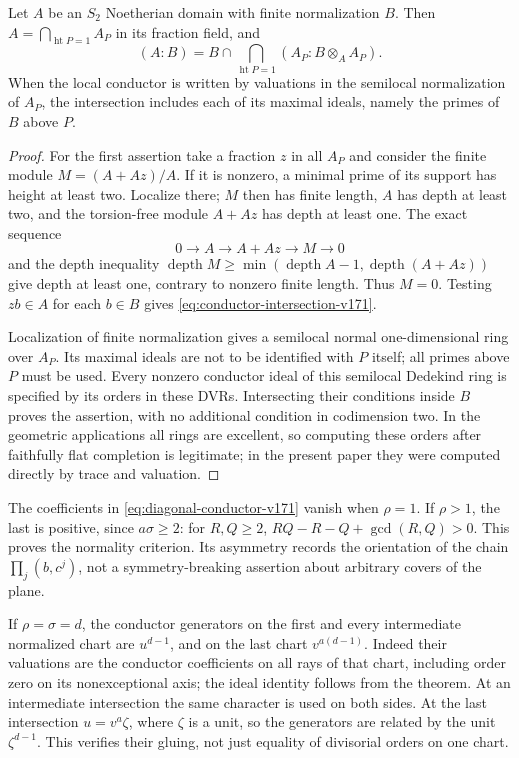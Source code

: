 \begin{lemma}
\label{lem:conductor-depth-v171}
Let $A$ be an $S_2$ Noetherian domain with finite normalization $B$.
Then $A=\bigcap_{\operatorname{ht}P=1}A_P$ in its fraction field, and
\begin{equation}\label{eq:conductor-intersection-v171}
 (A:B)=B\cap\bigcap_{\operatorname{ht}P=1}
             (A_P:B\otimes_A A_P).
\end{equation}
When the local conductor is written by valuations in the semilocal
normalization of $A_P$, the intersection includes each of its maximal
ideals, namely the primes of $B$ above $P$.
\end{lemma}
\begin{proof}
For the first assertion take a fraction $z$ in all $A_P$ and consider
the finite module $M=(A+Az)/A$. If it is nonzero, a minimal prime of
its support has height at least two. Localize there; $M$ then has
finite length, $A$ has depth at least two, and the torsion-free
module $A+Az$ has depth at least one. The exact sequence
\[
 0\longrightarrow A\longrightarrow A+Az\longrightarrow M
 \longrightarrow0
\]
and the depth inequality
$\operatorname{depth}M\geq\min(\operatorname{depth}A-1,
\operatorname{depth}(A+Az))$ give depth at least one, contrary to
nonzero finite length. Thus $M=0$. Testing $zb\in A$ for each $b\in B$
gives \eqref{eq:conductor-intersection-v171}.

Localization of finite normalization gives a semilocal normal
one-dimensional ring over $A_P$. Its maximal ideals are not to be
identified with $P$ itself; all primes above $P$ must be used.
Every nonzero conductor ideal of this semilocal Dedekind ring is
specified by its orders in these DVRs. Intersecting their conditions
inside $B$ proves the assertion, with no additional condition in
codimension two. In the geometric applications all rings are excellent,
so computing these orders after faithfully flat completion is legitimate;
in the present paper they were computed directly by trace and valuation.
\end{proof}

The coefficients in \eqref{eq:diagonal-conductor-v171} vanish when
$\rho=1$. If $\rho>1$, the last is positive, since $a\sigma\geq2$:
for $R,Q\geq2$, $RQ-R-Q+\gcd(R,Q)>0$. This proves the normality
criterion. Its asymmetry records the orientation of the chain
$\prod_j(b,c^j)$, not a symmetry-breaking assertion about arbitrary
covers of the plane.

If $\rho=\sigma=d$, the conductor generators on the first and every
intermediate normalized chart are $u^{d-1}$, and on the last chart
$v^{a(d-1)}$. Indeed their valuations are the conductor coefficients
on all rays of that chart, including order zero on its nonexceptional
axis; the ideal identity follows from the theorem. At an intermediate
intersection the same character is used on both sides. At the last
intersection $u=v^a\zeta$, where $\zeta$ is a unit, so the generators
are related by the unit $\zeta^{d-1}$. This verifies their gluing,
not just equality of divisorial orders on one chart.

